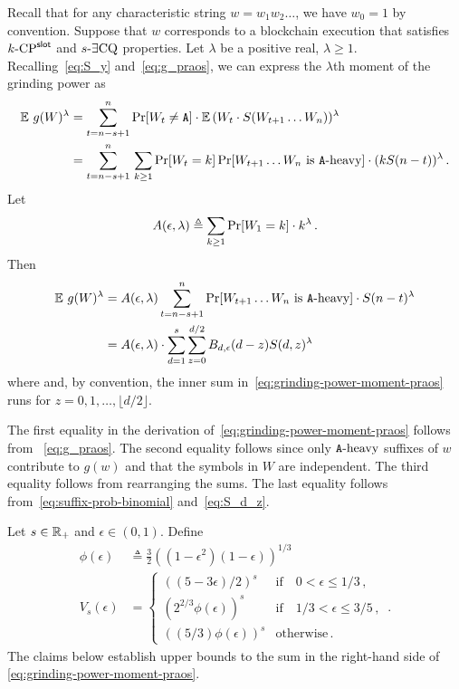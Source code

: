Recall that for any characteristic string $w = w_1 w_2 \ldots$, 
we have $w_0 = 1$ by convention. 
Suppose that $w$ corresponds to a blockchain execution that 
satisfies ${k}\text{-}\mathrm{CP}^{\mathsf{slot}}$ and ${s}\text{-}\exists\mathrm{CQ}$ properties.
Let $\lambda$ be a positive real, $\lambda \geq 1$. 
Recalling~\eqref{eq:S_y} and~\eqref{eq:g_praos}, 
we can express the $\lambda$th moment of the grinding power as
\begin{align}\label{eq:grinding-power-moment-praos}
    \operatorname{\mathbb{E}}\, g(W)^\lambda 
    &= \sum_{t = n-s+1}^n \Pr[W_t \neq \mathtt{A}] \cdot \operatorname{\mathbb{E}}\, (W_t \cdot S(W_{t+1}\ldots W_n))^\lambda \nonumber \\
    &= \sum_{t = n-s+1}^n\,
    \sum_{k \geq 1} 
      \Pr[W_{t} = k] \Pr[\text{$W_{t+1}\ldots W_n$ is $\mathtt{A}\text{-heavy}$}]\cdot (k S(n - t) )^\lambda \nonumber\,.
\end{align}
Let
\begin{equation}
  A(\epsilon, \lambda) \triangleq \sum_{k\geq 1} \Pr[W_1 = k] \cdot k^\lambda
  \,.
  \label{eq:A}
\end{equation}
Then
\begin{align}
    \Exp\, g(W)^\lambda 
    &= A(\epsilon, \lambda) 
      \sum_{t = n-s+1}^n 
      \Pr[\text{$W_{t+1}\ldots W_n$ is $\Aheavy$}]\cdot S(n-t)^\lambda \nonumber \\
    &=  %
        A(\epsilon, \lambda)
        \cdot 
        \sum_{d=1}^s \sum_{z = 0}^{ d/2 } B_{d, \epsilon}(d - z) S(d,z)^\lambda
\end{align}
where 
and, by convention, 
the inner sum in~\eqref{eq:grinding-power-moment-praos} 
runs for $z = 0, 1, \ldots, \lfloor d/2 \rfloor$.




The first equality in the derivation of~\eqref{eq:grinding-power-moment-praos} follows from 
~\eqref{eq:g_praos}. 
The second equality follows 
since only $\mathtt{A}\text{-heavy}$ suffixes of $w$ contribute to $g(w)$ 
and that the symbols in $W$ are independent. 
The third equality follows from rearranging the sums. 
The last equality follows from~\eqref{eq:suffix-prob-binomial} 
and~\eqref{eq:S_d_z}.

Let $s \in \mathbb{R}_+$ and $\epsilon \in (0,1)$. 
Define 
\begin{align}
  \phi(\epsilon) &\triangleq \frac{3}{2} \left( (1-\epsilon^2) (1-\epsilon) \right)^{1/3}\label{eq:phi_eps} \\
  V_s(\epsilon) &= \begin{cases}
      \left( (5-3 \epsilon)/2 \right)^s & \text{if}\quad 0 < \epsilon \leq 1/3\,, \\
      \left( 2^{2/3} \phi(\epsilon) \right)^s & \text{if}\quad 1/3 < \epsilon \leq 3/5\,, \\
      \left( (5/3) \phi(\epsilon) \right)^s & \text{otherwise}\,. 
    \end{cases} 
  \,. \label{eq:V-eps-praos}
\end{align}
\noindent
The claims below establish upper bounds to the 
sum in the right-hand side of \eqref{eq:grinding-power-moment-praos}.


